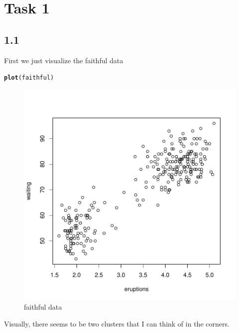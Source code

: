 \documentclass[10pt, a4paper, english]{article}\usepackage[]{graphicx}\usepackage[dvipsnames]{xcolor}
\makeatletter
\def\maxwidth{ %
  \ifdim\Gin@nat@width>\linewidth
    \linewidth
  \else
    \Gin@nat@width
  \fi
}
\newcommand{\hlstd}[1]{\textcolor[rgb]{0.345,0.345,0.345}{#1}}%
\newcommand{\hlkwd}[1]{\textcolor[rgb]{0.737,0.353,0.396}{\textbf{#1}}}%
\newenvironment{kframe}{%
 \def\at@end@of@kframe{}%
 \ifinner\ifhmode%
  \def\at@end@of@kframe{\end{minipage}}%
  \begin{minipage}{\columnwidth}%
 \fi\fi%
 \def\FrameCommand##1{\hskip\@totalleftmargin \hskip-\fboxsep
 \colorbox{shadecolor}{##1}\hskip-\fboxsep
     \hskip-\linewidth \hskip-\@totalleftmargin \hskip\columnwidth}%
 \MakeFramed {\advance\hsize-\width
   \@totalleftmargin\z@ \linewidth\hsize
   \@setminipage}}%
 {\par\unskip\endMakeFramed%
 \at@end@of@kframe}
\newenvironment{knitrout}{}{} %
\makeatother
\begin{document}
\section{Task 1}
\subsection{1.1}
First we just visualize the faithful data 
\begin{knitrout}
\color{fgcolor}\begin{kframe}
\begin{alltt}
\hlkwd{plot}\hlstd{(faithful)}
\end{alltt}
\end{kframe}\begin{figure}
\includegraphics[width=\maxwidth]{figure/unnamed-chunk-4-1} \caption[faithful data]{faithful data}\label{fig:unnamed-chunk-4}
\end{figure}

\end{knitrout}
Visually, there seems to be two clusters that I can think of in the corners. 
\end{document}
